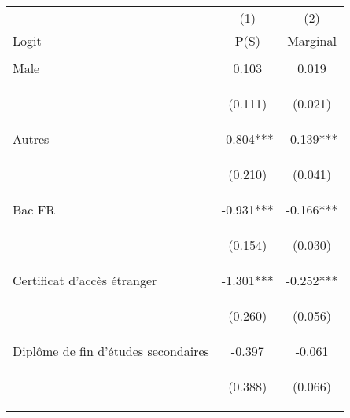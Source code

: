 
\begin{center}
\begin{tabular}{lcc} \hline
 & (1) & (2) \\
Logit & P(S) & Marginal \\ \hline
\vspace{4pt} & \begin{footnotesize}\end{footnotesize} & \begin{footnotesize}\end{footnotesize} \\
Male & 0.103 & 0.019 \\
\vspace{4pt} & \begin{footnotesize}(0.111)\end{footnotesize} & \begin{footnotesize}(0.021)\end{footnotesize} \\
Autres & -0.804*** & -0.139*** \\
\vspace{4pt} & \begin{footnotesize}(0.210)\end{footnotesize} & \begin{footnotesize}(0.041)\end{footnotesize} \\
Bac FR & -0.931*** & -0.166*** \\
\vspace{4pt} & \begin{footnotesize}(0.154)\end{footnotesize} & \begin{footnotesize}(0.030)\end{footnotesize} \\
Certificat d'accès étranger & -1.301*** & -0.252*** \\
\vspace{4pt} & \begin{footnotesize}(0.260)\end{footnotesize} & \begin{footnotesize}(0.056)\end{footnotesize} \\
Diplôme de fin d'études secondaires & -0.397 & -0.061 \\
\vspace{4pt} & \begin{footnotesize}(0.388)\end{footnotesize} & \begin{footnotesize}(0.066)\end{footnotesize} \\

\end{tabular}
\end{center}
